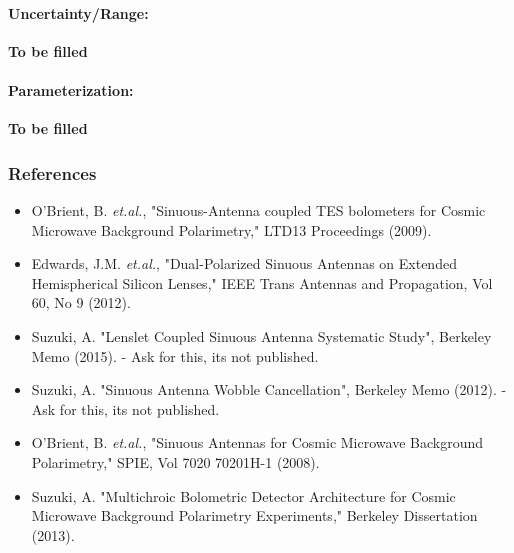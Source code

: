 \paragraph{Uncertainty/Range:}
\textbf{To be filled}

\paragraph{Parameterization:}
\textbf{To be filled}

\subsubsection{References}
\begin{itemize}
\item O'Brient, B. \textit{et.al.}, "Sinuous-Antenna coupled TES bolometers for Cosmic Microwave Background
Polarimetry," LTD13 Proceedings (2009).
\item Edwards, J.M. \textit{et.al.}, "Dual-Polarized Sinuous Antennas on Extended
Hemispherical Silicon Lenses," IEEE Trans Antennas and Propagation, Vol 60, No 9 (2012).
\item Suzuki, A. "Lenslet Coupled Sinuous Antenna Systematic Study", Berkeley Memo (2015). - Ask for this, its not published.
\item Suzuki, A. "Sinuous Antenna Wobble Cancellation", Berkeley Memo (2012). - Ask for this, its not published.
\item O'Brient, B. \textit{et.al.}, "Sinuous Antennas for Cosmic Microwave Background
Polarimetry," SPIE, Vol 7020 70201H-1 (2008).
\item Suzuki, A. "Multichroic Bolometric Detector Architecture for Cosmic Microwave Background Polarimetry Experiments," Berkeley Dissertation (2013).
\end{itemize} 
